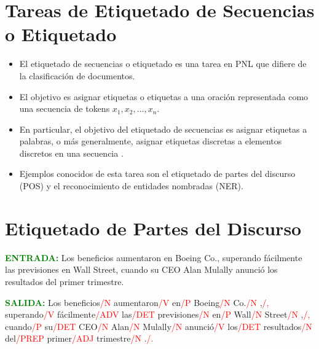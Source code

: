 
\section{Tareas de Etiquetado de Secuencias o Etiquetado}
\begin{itemize}
  \item El etiquetado de secuencias o etiquetado es una tarea en PNL que difiere de la clasificación de documentos.
  \item El objetivo es asignar etiquetas o etiquetas a una oración representada como una secuencia de tokens $x_1, x_2, \dots, x_n$.
  \item En particular, el objetivo del etiquetado de secuencias es asignar etiquetas a palabras, o más generalmente, asignar etiquetas discretas a elementos discretos en una secuencia \cite{jacobbook}.
  \item Ejemplos conocidos de esta tarea son el etiquetado de partes del discurso (POS) y el reconocimiento de entidades nombradas (NER).
\end{itemize}

\section{Etiquetado de Partes del Discurso}
\textcolor{green}{\textbf{ENTRADA:}}
Los beneficios aumentaron en Boeing Co., superando fácilmente las previsiones en Wall Street, cuando su CEO Alan Mulally anunció los resultados del primer trimestre.  \vspace{0.5cm}

\textcolor{green}{\textbf{SALIDA:}}
Los beneficios\textcolor{red}{/N} aumentaron\textcolor{red}{/V} en\textcolor{red}{/P} Boeing\textcolor{red}{/N} Co.\textcolor{red}{/N} ,\textcolor{red}{/,} superando\textcolor{red}{/V} fácilmente\textcolor{red}{/ADV} las\textcolor{red}{/DET} previsiones\textcolor{red}{/N} en\textcolor{red}{/P} Wall\textcolor{red}{/N} Street\textcolor{red}{/N} ,\textcolor{red}{/,} cuando\textcolor{red}{/P} su\textcolor{red}{/DET} CEO\textcolor{red}{/N} Alan\textcolor{red}{/N} Mulally\textcolor{red}{/N} anunció\textcolor{red}{/V} los\textcolor{red}{/DET} resultados\textcolor{red}{/N} del\textcolor{red}{/PREP} primer\textcolor{red}{/ADJ} trimestre\textcolor{red}{/N} .\textcolor{red}{/.}  \vspace{0.5cm}

